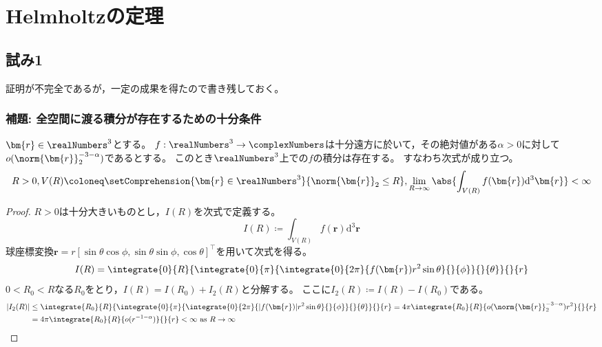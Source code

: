     \section{Helmholtzの定理}
        \subsection{試み1}
            証明が不完全であるが，一定の成果を得たので書き残しておく。
            \subsubsection{補題: 全空間に渡る積分が存在するための十分条件}
                \label{全空間に渡る積分が存在するための十分条件}
                \begin{shadebox}
                    $\bm{r}\in\realNumbers^3$とする。
                    $f:\realNumbers^3\to\complexNumbers$は十分遠方に於いて，その絶対値がある$\alpha>0$に対して$o(\norm{\bm{r}}_2^{-3-\alpha})$であるとする。
                    このとき$\realNumbers^3$上での$f$の積分は存在する。
                    すなわち次式が成り立つ。
                    \[ R>0, V(R) \coloneq \setComprehension{\bm{r}\in\realNumbers^3}{\norm{\bm{r}}_2 \leq R} ,\lim_{R\to\infty} \abs{\int_{V(R)} f(\bm{r}) \mathrm{d}^3\bm{r}} < \infty \]
                \end{shadebox}
                \begin{proof}
                    \quad\par
                    $R>0$は十分大きいものとし，$I(R)$を次式で定義する。
                    \[ I(R) \coloneq \int_{V(R)} f(\bm{r}) \mathrm{d}^3\bm{r} \]
                    球座標変換$\bm{r} = r[\sin\theta\cos\phi,\sin\theta\sin\phi,\cos\theta]^\top$を用いて次式を得る。
                    \[ I(R) = \integrate{0}{R}{\integrate{0}{\pi}{\integrate{0}{2\pi}{f(\bm{r})r^2\sin\theta}{}{\phi}}{}{\theta}}{}{r} \]
                    $0<R_0<R$なる$R_0$をとり，$I(R) = I(R_0) + I_2(R)$と分解する。
                    ここに$I_2(R) \coloneq I(R) - I(R_0)$である。
                    \begin{align*}
                        |I_2(R)| &\leq \integrate{R_0}{R}{\integrate{0}{\pi}{\integrate{0}{2\pi}{|f(\bm{r})|r^2\sin\theta}{}{\phi}}{}{\theta}}{}{r} = 4\pi\integrate{R_0}{R}{o(\norm{\bm{r}}_2^{-3-\alpha})r^2}{}{r} \\
                        &= 4\pi\integrate{R_0}{R}{o(r^{-1-\alpha})}{}{r} < \infty \text{ as } R\to\infty
                    \end{align*}
                \end{proof}
